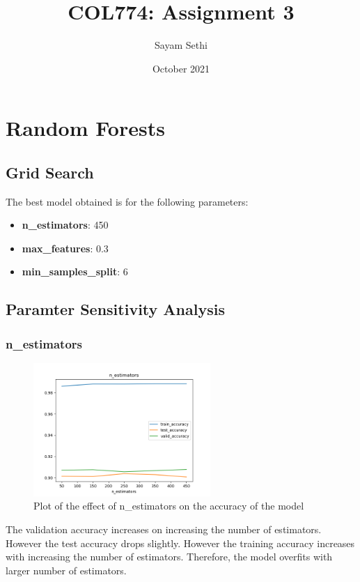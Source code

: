 \documentclass[11pt]{article}
\title{COL774: Assignment 3}
\author{Sayam Sethi}
\date{October 2021}
\begin{document}
\maketitle

\tableofcontents

\section{Random Forests}

\subsection{Grid Search}
The best model obtained is for the following parameters:
\begin{itemize}
  \item \textbf{n\_estimators}: 450
  \item \textbf{max\_features}: 0.3
  \item \textbf{min\_samples\_split}: 6
\end{itemize}

\subsection{Paramter Sensitivity Analysis}
\subsubsection{n\_estimators}
\begin{figure}[H]
  \centering
  \includegraphics[width=0.6\textwidth]{Q1/output/d_n.png}
  \caption{Plot of the effect of n\_estimators on the accuracy of the model}
\end{figure}
The validation accuracy increases on increasing the number of estimators. However the test accuracy drops slightly. However the training accuracy increases with increasing the number of estimators. Therefore, the model overfits with larger number of estimators.
\end{document}

